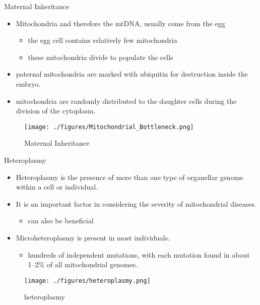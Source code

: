 \documentclass[presentation, smaller]{beamer}
\begin{document}
\begin{frame}[label={sec:org1be77f0}]{Maternal Inheritance}
\begin{itemize}
\item Mitochondria and therefore the mtDNA, usually come from the egg
\begin{itemize}
\item the egg cell contains relatively few mitochondria
\item these mitochondria divide to populate the cells
\end{itemize}
\item paternal mitochondria are marked with ubiquitin for destruction
inside the embryo.
\item mitochondria are randomly distributed to the daughter cells during
the division of the cytoplasm.
\end{itemize}

\begin{figure}[htbp]
\centering
\texttt{[image: ./figures/Mitochondrial\_Bottleneck.png]}
\caption[mom]{\label{fig:org67c4d3f}
Maternal Inheritance}
\end{figure}
\end{frame}

\begin{frame}[label={sec:orgcce0268}]{Heteroplasmy}
\begin{itemize}
\item Heteroplasmy is the presence of more than one type of organellar
genome within a cell or individual.

\item It is an important factor in considering the severity of
mitochondrial diseases.
\begin{itemize}
\item can also be beneficial
\end{itemize}

\item Microheteroplasmy is present in most individuals.
\begin{itemize}
\item hundreds of independent mutations, with each mutation found in
about 1–2\% of all mitochondrial genomes.
\end{itemize}
\end{itemize}


\begin{figure}[htbp]
\centering
\texttt{[image: ./figures/heteroplasmy.png]}
\caption[heter]{\label{fig:orgea49b24}
heteroplasmy}
\end{figure}
\end{frame}
\end{document}
